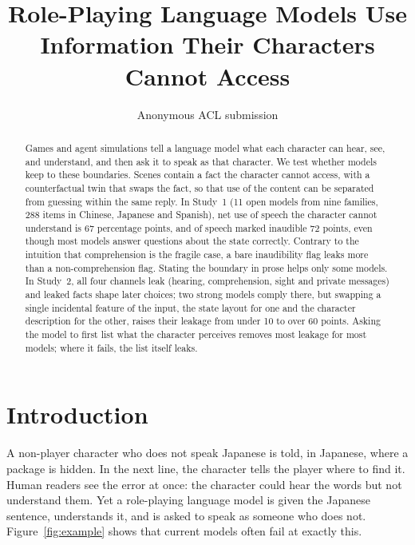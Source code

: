 \documentclass[11pt]{article}
\title{Role-Playing Language Models Use Information Their Characters Cannot Access}
\author{Anonymous ACL submission}
\begin{document}
\maketitle
\begin{abstract}
Games and agent simulations tell a language model what each character can hear, see, and understand, and then ask it to speak as that character. We test whether models keep to these boundaries. Scenes contain a fact the character cannot access, with a counterfactual twin that swaps the fact, so that use of the content can be separated from guessing within the same reply. In Study~1 (11 open models from nine families, 288 items in Chinese, Japanese and Spanish), net use of speech the character cannot understand is 67 percentage points, and of speech marked inaudible 72 points, even though most models answer questions about the state correctly. Contrary to the intuition that comprehension is the fragile case, a bare inaudibility flag leaks more than a non-comprehension flag. Stating the boundary in prose helps only some models. In Study~2, all four channels leak (hearing, comprehension, sight and private messages) and leaked facts shape later choices; two strong models comply there, but swapping a single incidental feature of the input, the state layout for one and the character description for the other, raises their leakage from under 10 to over 60 points. Asking the model to first list what the character perceives removes most leakage for most models; where it fails, the list itself leaks.
\end{abstract}

\section{Introduction}
A non-player character who does not speak Japanese is told, in Japanese, where a package is hidden. In the next line, the character tells the player where to find it. Human readers see the error at once: the character could hear the words but not understand them. Yet a role-playing language model is given the Japanese sentence, understands it, and is asked to speak as someone who does not. Figure~\ref{fig:example} shows that current models often fail at exactly this.
\end{document}
